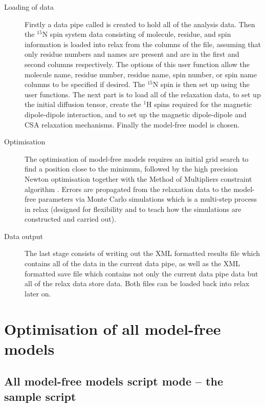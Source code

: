 \begin{htmlonly}
\begin{htmlonly}
\begin{description}
\item[Loading of data] Firstly a data pipe called  is created to hold all of the analysis data.  Then the $^{15}$N spin system data consisting of molecule, residue, and spin information is loaded into relax from the columns of the  file, assuming that only residue numbers and names are present and are in the first and second columns respectively.  The options of this  user function allow the molecule name, residue number, residue name, spin number, or spin name columns to be specified if desired.  The $^{15}$N spin is then set up using the  user functions.  The next part is to load all of the relaxation data, to set up the initial diffusion tensor, create the $^1$H spins required for the magnetic dipole-dipole interaction, and to set up the magnetic dipole-dipole and CSA relaxation mechanisms.  Finally the model-free model  is chosen.
\item[Optimisation] The optimisation of model-free models requires an initial grid search to find a position close to the minimum, followed by the high precision Newton optimisation together with the Method of Multipliers constraint algorithm \citep{dAuvergneGooley08a}.  Errors are propagated from the relaxation data to the model-free parameters via Monte Carlo simulations which is a multi-step process in relax (designed for flexibility and to teach how the simulations are constructed and carried out).
\item[Data output] The last stage consists of writing out the XML formatted results file which contains all of the data in the current data pipe, as well as the XML formatted save file which contains not only the current data pipe data but all of the relax data store data.  Both files can be loaded back into relax later on.
\end{description}




\section{Optimisation of all model-free models}



\subsection{All model-free models script mode -- the sample script}


\end{htmlonly}
\end{htmlonly}
